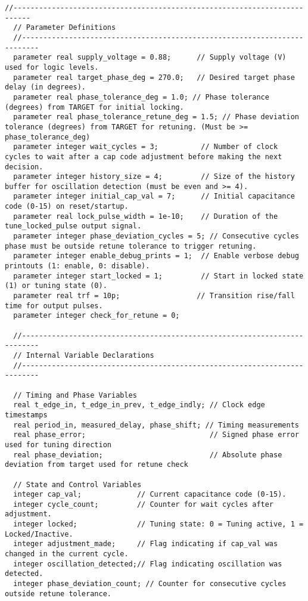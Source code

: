 \begin{lstlisting}[caption={Verilog-A Generic Capacitor Tuner Implementation}]
  //--------------------------------------------------------------------------
  // Parameter Definitions
  //--------------------------------------------------------------------------
  parameter real supply_voltage = 0.88;      // Supply voltage (V) used for logic levels.
  parameter real target_phase_deg = 270.0;   // Desired target phase delay (in degrees).
  parameter real phase_tolerance_deg = 1.0; // Phase tolerance (degrees) from TARGET for initial locking.
  parameter real phase_tolerance_retune_deg = 1.5; // Phase deviation tolerance (degrees) from TARGET for retuning. (Must be >= phase_tolerance_deg)
  parameter integer wait_cycles = 3;          // Number of clock cycles to wait after a cap code adjustment before making the next decision.
  parameter integer history_size = 4;         // Size of the history buffer for oscillation detection (must be even and >= 4).
  parameter integer initial_cap_val = 7;      // Initial capacitance code (0-15) on reset/startup.
  parameter real lock_pulse_width = 1e-10;    // Duration of the tune_locked_pulse output signal.
  parameter integer phase_deviation_cycles = 5; // Consecutive cycles phase must be outside retune tolerance to trigger retuning.
  parameter integer enable_debug_prints = 1;  // Enable verbose debug printouts (1: enable, 0: disable).
  parameter integer start_locked = 1;         // Start in locked state (1) or tuning state (0).
  parameter real trf = 10p;                  // Transition rise/fall time for output pulses.
  parameter integer check_for_retune = 0;

  //--------------------------------------------------------------------------
  // Internal Variable Declarations
  //--------------------------------------------------------------------------

  // Timing and Phase Variables
  real t_edge_in, t_edge_in_prev, t_edge_indly; // Clock edge timestamps
  real period_in, measured_delay, phase_shift; // Timing measurements
  real phase_error;                             // Signed phase error used for tuning direction
  real phase_deviation;                         // Absolute phase deviation from target used for retune check

  // State and Control Variables
  integer cap_val;             // Current capacitance code (0-15).
  integer cycle_count;         // Counter for wait cycles after adjustment.
  integer locked;              // Tuning state: 0 = Tuning active, 1 = Locked/Inactive.
  integer adjustment_made;     // Flag indicating if cap_val was changed in the current cycle.
  integer oscillation_detected;// Flag indicating oscillation was detected.
  integer phase_deviation_count; // Counter for consecutive cycles outside retune tolerance.


\end{lstlisting}
